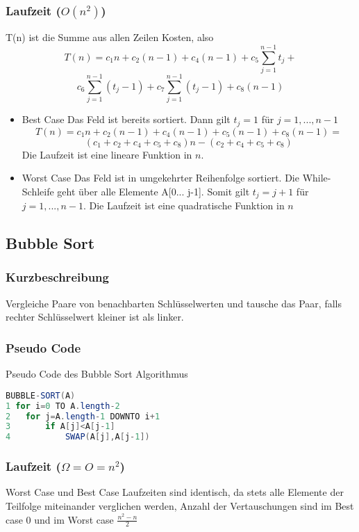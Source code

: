 \documentclass[jou,apacite]{apa6}
\begin{document}
   
\subsubsection{Laufzeit ($O(n^2)$)} T(n) ist die Summe aus allen Zeilen Kosten, also 
    \[T(n)=c_{1}n+c_2(n-1)+c_4(n-1)+c_5\sum\limits_{j=1}^{n-1}t_j+\]\[c_6\sum\limits_{j=1}^{n-1}(t_j-1)+c_7\sum\limits_{j=1}^{n-1}(t_j-1)+c_8(n-1)\]
    
    
\begin{itemize}
    \item Best Case Das Feld ist bereits sortiert. Dann gilt $t_j=1$ für $j=1,...,n-1$  \[ T(n) = c_1n + c_2(n-1) + c_4(n-1) + c_5(n-1) + c_8(n-1) =\]\[ (c_1 + c_2 + c_4 + c_5 + c_8) n -(c_2 + c_4 + c_5 + c_8) \] Die Laufzeit ist eine lineare Funktion in $n$.
    \item Worst Case  Das Feld ist in umgekehrter Reihenfolge sortiert. Die While-Schleife geht über alle Elemente A[0... j-1]. Somit gilt $t_j = j+1$ für $j = 1,...,n-1$. Die Laufzeit ist eine quadratische Funktion in $n$
    \end{itemize}
    
\subsection{Bubble Sort}
\subsubsection{Kurzbeschreibung}

Vergleiche Paare von benachbarten Schlüsselwerten und tausche das Paar, falls rechter Schlüsselwert kleiner ist als linker.

\subsubsection{Pseudo Code}
Pseudo Code des Bubble Sort Algorithmus
\begin{lstlisting}[language=Java]
BUBBLE-SORT(A)
1 for i=0 TO A.length-2
2   for j=A.length-1 DOWNTO i+1
3       if A[j]<A[j-1]
4           SWAP(A[j],A[j-1])
\end{lstlisting}

\subsubsection{Laufzeit ($\Omega = O = n^2$)}
 Worst Case und Best Case Laufzeiten sind identisch, da stets alle Elemente der Teilfolge miteinander verglichen werden,
 Anzahl der Vertauschungen sind im Best case 0 und im Worst case $\frac{n^2-n}{2}$
\end{document}
